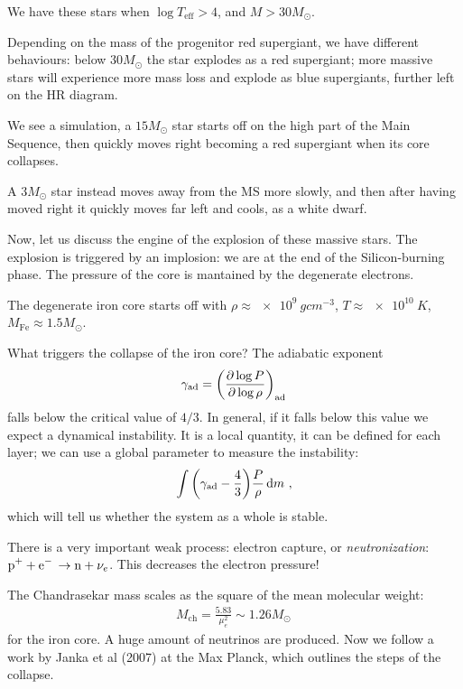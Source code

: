 \documentclass[main.tex]{subfiles}
\begin{document}
We have these stars when \(\log T _{\text{eff}} > 4\), and \(M > 30 M_{\odot}\). 

Depending on the mass of the progenitor red supergiant, we have different behaviours: below \(30 M_{\odot} \) the star explodes as a red supergiant; more massive stars will experience more mass loss and explode as blue supergiants, further left on the HR diagram. 

We see a simulation, a \(15 M_{\odot}  \) star starts off on the high part of the Main Sequence, then quickly moves right becoming a red supergiant when its core collapses.

A \(3 M_{\odot}\) star instead moves away from the MS more slowly, and then after having moved right it quickly moves far left and cools, as a white dwarf. 

Now, let us discuss the engine of the explosion of these massive stars. The explosion is triggered by an implosion: we are at the end of the Silicon-burning phase. 
The pressure of the core is mantained by the degenerate electrons. 

The degenerate iron core starts off with \(\rho \approx
\SI{e9}{g cm^{-3}}\), \(T \approx \SI{e10}{K}\), \(M _{\text{Fe}} \approx \num{1.5} M_{\odot}\). 

What triggers the collapse of the iron core? The adiabatic exponent 
%
\begin{align}
  \gamma _{\text{ad}} = \qty(\pdv{\log P}{\log \rho })_{\text{ad}}
\,
\end{align}
%
falls below the critical value of \(4/3\). 
In general, if it falls below this value we expect a dynamical instability. It is a local quantity, it can be defined for each layer; we can use a global parameter to measure the instability: 
%
\begin{align}
  \int \qty(\gamma _{\text{ad}} - \frac{4}{3}) \frac{P}{\rho } \dd{m}
\,,
\end{align}
%
which will tell us whether the system as a whole is stable. 

There is a very important weak process: electron capture, or \emph{neutronization}: \(\ce{p+ + e- \rightarrow n +} \nu_{e}\). This decreases the electron pressure!

The Chandrasekar mass scales as the square of the mean molecular weight: 
%
\begin{align}
  M _{\text{ch}} = \frac{5.83}{\mu_{e}^2} \sim 1.26 M_{\odot}
\,
\end{align}
%
for the iron core. A huge amount of neutrinos are produced. 
Now we follow a work by Janka et al (2007) at the Max Planck, which outlines the steps of the collapse. 
\end{document}
